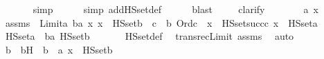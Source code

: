 \begin{isabellebody}
\ \ \ \ \ \isamarkupfalse%
\ simp\ \isanewline
\ \ \ \ \isamarkupfalse%
{\isacharparenleft}{\kern0pt}simp\ add{\isacharcolon}{\kern0pt}HS{\isacharunderscore}{\kern0pt}set{\isacharunderscore}{\kern0pt}def{\isacharparenright}{\kern0pt}\ \isanewline
\ \ \ \isamarkupfalse%
\ blast\ \isanewline
\ \ \isamarkupfalse%
\ clarify\ \isanewline
{}\isamarkupfalse%
\ {\isacharminus}{\kern0pt}\ \isanewline
\ \ \isamarkupfalse%
\ a\ x\ \isamarkupfalse%
\ assms\ {\isacharcolon}{\kern0pt}\ {\isachardoublequoteopen}Limit{\isacharparenleft}{\kern0pt}a{\isacharparenright}{\kern0pt}{\isachardoublequoteclose}\ {\isachardoublequoteopen}{\isasymforall}b{\isasymin}a{\isachardot}{\kern0pt}\ {\isasymforall}x{\isachardot}{\kern0pt}\ x\ {\isasymin}\ HS{\isacharunderscore}{\kern0pt}set{\isacharparenleft}{\kern0pt}b{\isacharparenright}{\kern0pt}\ {\isasymlongrightarrow}\ {\isacharparenleft}{\kern0pt}{\isasymexists}c\ {\isacharless}{\kern0pt}\ b{\isachardot}{\kern0pt}\ Ord{\isacharparenleft}{\kern0pt}c{\isacharparenright}{\kern0pt}\ {\isasymand}\ x\ {\isasymin}\ HS{\isacharunderscore}{\kern0pt}set{\isacharparenleft}{\kern0pt}succ{\isacharparenleft}{\kern0pt}c{\isacharparenright}{\kern0pt}{\isacharparenright}{\kern0pt}{\isacharparenright}{\kern0pt}{\isachardoublequoteclose}\ {\isachardoublequoteopen}x\ {\isasymin}\ HS{\isacharunderscore}{\kern0pt}set{\isacharparenleft}{\kern0pt}a{\isacharparenright}{\kern0pt}{\isachardoublequoteclose}\ \isanewline
\ \ \isamarkupfalse%
\ {\isachardoublequoteopen}HS{\isacharunderscore}{\kern0pt}set{\isacharparenleft}{\kern0pt}a{\isacharparenright}{\kern0pt}\ {\isacharequal}{\kern0pt}\ {\isacharparenleft}{\kern0pt}{\isasymUnion}b{\isacharless}{\kern0pt}a{\isachardot}{\kern0pt}\ HS{\isacharunderscore}{\kern0pt}set{\isacharparenleft}{\kern0pt}b{\isacharparenright}{\kern0pt}{\isacharparenright}{\kern0pt}{\isachardoublequoteclose}\ \isanewline
\ \ \ \ \isamarkupfalse%
\ HS{\isacharunderscore}{\kern0pt}set{\isacharunderscore}{\kern0pt}def\ \isamarkupfalse%
\ transrec{}{\isacharunderscore}{\kern0pt}Limit\ assms\ \isamarkupfalse%
\ auto\ \isanewline
\ \ \isamarkupfalse%
\ \isamarkupfalse%
\ b\ \ bH\ {\isacharcolon}{\kern0pt}\ {\isachardoublequoteopen}b\ {\isacharless}{\kern0pt}\ a{\isachardoublequoteclose}\ {\isachardoublequoteopen}x\ {\isasymin}\ HS{\isacharunderscore}{\kern0pt}set{\isacharparenleft}{\kern0pt}b{\isacharparenright}{\kern0pt}{\isachardoublequoteclose}\ \isamarkupfalse%

\end{isabellebody}
